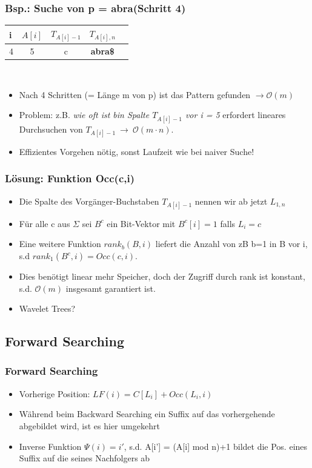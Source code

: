 \documentclass{beamer}
\begin{document}
\begin{frame}
\frametitle{Bsp.: Suche von p = \glqq abra\grqq  (Schritt 4)}
\begin{tabular}{l<{\ttfamily}|c<{\ttfamily} c<{\ttfamily}c<{\ttfamily} r<{\ttfamily}}
\textbf{i} & $A[i]$ & $T_{A[i]-1}$ & $T_{A[i],n}$\\\hline
4 & 5 & c & \color{red}\textbf{abra\$} \\
\end{tabular}\\[5mm]
\begin{itemize}
\item Nach 4 Schritten (= Länge m von p) ist das Pattern gefunden $\rightarrow \mathcal{O}(m)$
\item Problem: z.B. \textit{wie oft ist \glqq b\grqq  in Spalte $T_{A[i]-1}$ vor i = 5} erfordert lineares Durchsuchen von $T_{A[i]-1}\ \rightarrow\ \mathcal{O}(m\cdot n)$.
\item Effizientes Vorgehen nötig, sonst Laufzeit wie bei naiver Suche!
\end{itemize}
\end{frame}
\begin{frame}
\frametitle{Lösung: Funktion Occ(c,i)}
\begin{itemize}
\item Die Spalte des Vorgänger-Buchstaben $T_{A[i]-1}$ nennen wir ab jetzt $L_{1,n}$
\item Für alle c aus $\Sigma$ sei $B^{c}$ ein Bit-Vektor mit $B^{c}[i] = 1$ falls $L_{i} = c$
\item Eine weitere Funktion $rank_{b}(B,i)$ liefert die Anzahl von zB b=1 in B vor i, s.d $rank_{1}(B^{c},i) = Occ(c,i)$.
\item Dies benötigt linear mehr Speicher, doch der Zugriff durch rank ist konstant, s.d. $\mathcal{O}(m)$ insgesamt garantiert ist.
\item Wavelet Trees?
\end{itemize}
\end{frame}
\begin{frame}
\subsection{Forward Searching}
\frametitle{Forward Searching}
\begin{itemize}
\item Vorherige Position: $LF(i) = C[L_i] + Occ(L_i,i)$
\item Während beim Backward Searching ein Suffix auf das vorhergehende abgebildet wird, ist es hier umgekehrt
\item Inverse Funktion $\Psi(i) = i'$, s.d. A[i'] = (A[i] mod n)+1 bildet die Pos. eines Suffix auf die seines Nachfolgers ab
\end{itemize}
\end{frame}
\end{document}
